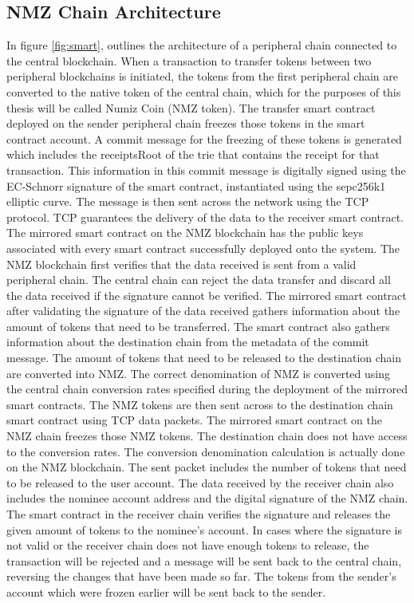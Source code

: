 \documentclass[a4paper,twoside,phd]{BYUPhys}
\begin{document}
\subsection{NMZ Chain Architecture}
In figure \ref{fig:smart}, outlines the architecture of a peripheral chain connected to the central blockchain. When a transaction to transfer tokens between two peripheral blockchains is initiated, the tokens from the first peripheral chain are converted to the native token of the central chain, which for the purposes of this thesis will be called Numiz Coin (NMZ token). The transfer smart contract deployed on the sender peripheral chain freezes those tokens in the smart contract account. A commit message for the freezing of these tokens is generated which includes the receiptsRoot of the trie that contains the receipt for that transaction. This information in this commit message is digitally signed using the EC-Schnorr signature of the smart contract, instantiated using the sepc256k1 elliptic curve. The message is then sent across the network using the TCP protocol. TCP guarantees the delivery of the data to the receiver smart contract. The mirrored smart contract on the NMZ blockchain has the public keys associated with every smart contract successfully deployed onto the system. The NMZ blockchain first verifies that the data received is sent from a valid peripheral chain. The central chain can reject the data transfer and discard all the data received if the signature cannot be verified. The mirrored smart contract after validating the signature of the data received gathers information about the amount of tokens that need to be transferred. The smart contract also gathers information about the destination chain from the metadata of the commit message. The amount of tokens that need to be released to the destination chain are converted into NMZ. The correct denomination of NMZ is converted using the central chain conversion rates specified during the deployment of the mirrored smart contracts. The NMZ tokens are then sent across to the destination chain smart contract using TCP data packets. The mirrored smart contract on the NMZ chain freezes those NMZ tokens. The destination chain does not have access to the conversion rates. The conversion denomination calculation is actually done on the NMZ blockchain. The sent packet includes the number of tokens that need to be released to the user account. The data received by the receiver chain also includes the nominee account address and the digital signature of the NMZ chain. The smart contract in the receiver chain verifies the signature and releases the given amount of tokens to the nominee's account. In cases where the signature is not valid or the receiver chain does not have enough tokens to release, the transaction will be rejected and a message will be sent back to the central chain, reversing the changes that have been made so far. The tokens from the sender's account which were frozen earlier will be sent back to the sender.
\end{document}

